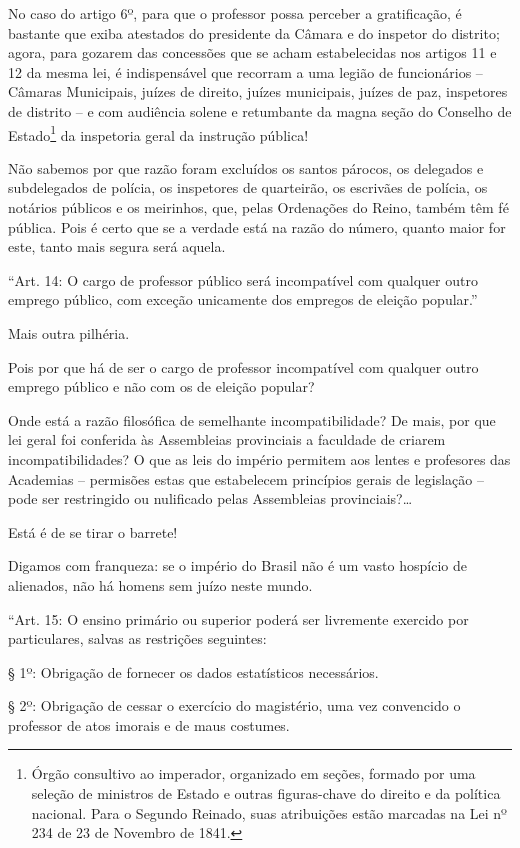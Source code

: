 No caso do artigo 6º, para que o professor possa perceber a
gratificação, é bastante que exiba atestados do presidente da Câmara e
do inspetor do distrito; agora, para gozarem das concessões que se acham
estabelecidas nos artigos 11 e 12 da mesma lei, é indispensável que
recorram a uma legião de funcionários -- Câmaras Municipais, juízes de
direito, juízes municipais, juízes de paz, inspetores de distrito -- e
com audiência solene e retumbante da magna seção do Conselho de
Estado\footnote{Órgão consultivo ao imperador, organizado em seções,
  formado por uma seleção de ministros de Estado e outras figuras-chave
  do direito e da política nacional. Para o Segundo Reinado, suas
  atribuições estão marcadas na Lei nº 234 de 23 de Novembro de 1841.}
da inspetoria geral da instrução pública!

Não sabemos por que razão foram excluídos os santos párocos, os
delegados e subdelegados de polícia, os inspetores de quarteirão, os
escrivães de polícia, os notários públicos e os meirinhos, que, pelas
Ordenações do Reino, também têm fé pública. Pois é certo que se a
verdade está na razão do número, quanto maior for este, tanto mais
segura será aquela.

``Art. 14: O cargo de professor público será incompatível com qualquer
outro emprego público, com exceção unicamente dos empregos de eleição
popular.''

Mais outra pilhéria.

Pois por que há de ser o cargo de professor incompatível com qualquer
outro emprego público e não com os de eleição popular?

Onde está a razão filosófica de semelhante incompatibilidade? De mais,
por que lei geral foi conferida às Assembleias provinciais a faculdade
de criarem incompatibilidades? O que as leis do império permitem aos
lentes e profesores das Academias -- permisões estas que estabelecem
princípios gerais de legislação -- pode ser restringido ou nulificado
pelas Assembleias provinciais?\ldots

Está é de se tirar o barrete!

Digamos com franqueza: se o império do Brasil não é um vasto hospício de
alienados, não há homens sem juízo neste mundo.

``Art. 15: O ensino primário ou superior poderá ser livremente exercido
por particulares, salvas as restrições seguintes:

§ 1º: Obrigação de fornecer os dados estatísticos necessários.

§ 2º: Obrigação de cessar o exercício do magistério, uma vez convencido
o professor de atos imorais e de maus costumes.

